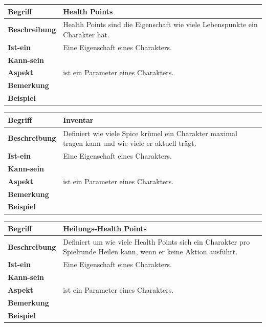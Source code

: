 \documentclass[12pt]{article}
\begin{document}
\begin{tabularx}{16cm}{|l|X|}
\hline
\textbf{Begriff} & \textbf{Health Points} \\
\hline
\textbf{Beschreibung} & Health Points sind die Eigenschaft wie viele Lebenspunkte ein Charakter hat.\\
\hline
\textbf{Ist-ein} & Eine Eigenschaft eines Charakters.\\
\hline
\textbf{Kann-sein} & \\
\hline
\textbf{Aspekt} & ist ein Parameter eines Charakters. \\
\hline
\textbf{Bemerkung} & \\
\hline
\textbf{Beispiel} &  \\
\hline
\end{tabularx}

\begin{tabularx}{16cm}{|l|X|}
\hline
\textbf{Begriff} & \textbf{Inventar} \\
\hline
\textbf{Beschreibung} & Definiert wie viele Spice krümel ein Charakter maximal tragen kann und wie viele er aktuell trägt. \\
\hline
\textbf{Ist-ein} & Eine Eigenschaft eines Charakters.\\
\hline
\textbf{Kann-sein} & \\
\hline
\textbf{Aspekt} & ist ein Parameter eines Charakters. \\
\hline
\textbf{Bemerkung} & \\
\hline
\textbf{Beispiel} &  \\
\hline
\end{tabularx}

\begin{tabularx}{16cm}{|l|X|}
\hline
\textbf{Begriff} & \textbf{Heilungs-Health Points } \\
\hline
\textbf{Beschreibung} & Definiert um wie viele Health Points sich ein Charakter pro Spielrunde Heilen kann, wenn er keine Aktion ausführt. \\
\hline
\textbf{Ist-ein} & Eine Eigenschaft eines Charakters.\\
\hline
\textbf{Kann-sein} & \\
\hline
\textbf{Aspekt} & ist ein Parameter eines Charakters. \\
\hline
\textbf{Bemerkung} & \\
\hline
\textbf{Beispiel} &  \\
\hline
\end{tabularx}
\end{document}
